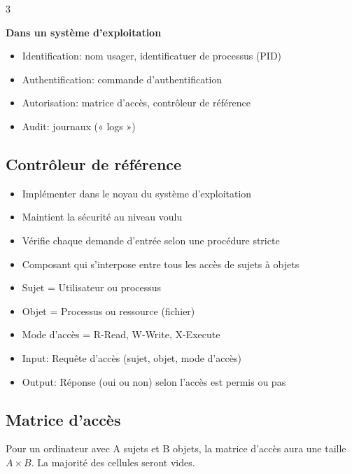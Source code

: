 \documentclass[9pt, a4paper, twoside]{article}
\begin{document}
\begin{multicols}{3}
\begin{flushleft}
    \scriptsize \textbf{Dans un système d'exploitation}
\end{flushleft}

\begin{itemize}[label={}]
    \item \scriptsize Identification: nom usager, identificatuer de processus (PID)
    \item \scriptsize Authentification: commande d'authentification
    \item \scriptsize Autorisation: matrice d'accès, contrôleur de référence
    \item \scriptsize Audit: journaux (« logs »)
\end{itemize}

\footnotesize \subsection{Contrôleur de référence}

\begin{itemize}[label={}]
    \item \scriptsize Implémenter dans le noyau du système d'exploitation
    \item \scriptsize Maintient la sécurité au niveau voulu
    \item \scriptsize Vérifie chaque demande d'entrée selon une procédure stricte
    \item \scriptsize Composant qui s'interpose entre tous les accès de sujets à objets
    \item \scriptsize Sujet = Utilisateur ou processus
    \item \scriptsize Objet = Processus ou ressource (fichier)
    \item \scriptsize Mode d'accès = {R-Read, W-Write, X-Execute}
    \item \scriptsize Input: Requête d'accès (sujet, objet, mode d'accès)
    \item \scriptsize Output: Réponse (oui ou non) selon l'accès est permis ou pas
\end{itemize}

\footnotesize \subsection{Matrice d'accès}

\begin{flushleft}
    \scriptsize Pour un ordinateur avec A sujets et B objets, la matrice d'accès aura une taille $A \times B$. La majorité des cellules seront vides.
\end{flushleft}


\end{multicols}
\end{document}
